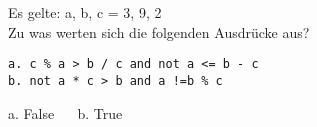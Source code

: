 \question[2]
Es gelte: a, b, c = 3, 9, 2\\
Zu was werten sich die folgenden Ausdrücke aus?
\begin{lstlisting}
a. c % a > b / c and not a <= b - c
b. not a * c > b and a !=b % c
\end{lstlisting}

\begin{solutionbox}{1cm}
a. False ~~ b. True
\end{solutionbox}

